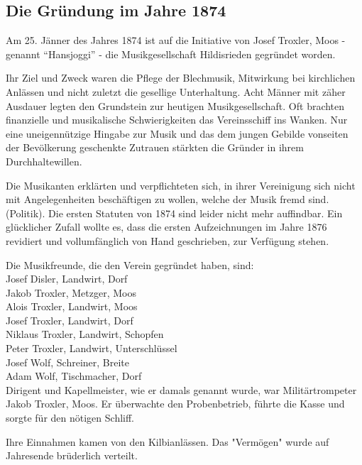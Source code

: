 \begin{history}

    \subsection*{Die Gründung im Jahre 1874}

    Am 25. Jänner des Jahres 1874 ist auf die Initiative von Josef Troxler, Moos
    - genannt \enquote{Hansjoggi} - die Musikgesellschaft Hildisrieden gegründet
    worden.

    Ihr Ziel und Zweck waren die Pflege der Blechmusik, Mitwirkung bei
    kirchlichen Anlässen und nicht zuletzt die gesellige Unterhaltung. Acht
    Männer mit zäher Ausdauer legten den Grundstein zur heutigen
    Musikgesellschaft. Oft brachten finanzielle und musikalische Schwierigkeiten
    das Vereinsschiff ins Wanken. Nur eine uneigennützige Hingabe zur Musik und
    das dem jungen Gebilde vonseiten der Bevölkerung geschenkte Zutrauen
    stärkten die Gründer in ihrem Durchhaltewillen.

    Die Musikanten erklärten und verpflichteten sich, in ihrer Vereinigung sich
    nicht mit Angelegenheiten beschäftigen zu wollen, welche der Musik fremd
    sind. (Politik). Die ersten Statuten von 1874 sind leider nicht mehr
    auffindbar. Ein glücklicher Zufall wollte es, dass die ersten Aufzeichnungen
    im Jahre 1876 revidiert und vollumfänglich von Hand geschrieben, zur
    Verfügung stehen.

    Die Musikfreunde, die den Verein gegründet haben, sind:\\

    \noindent
    Josef Disler, Landwirt, Dorf\\
    Jakob Troxler, Metzger, Moos\\
    Alois Troxler, Landwirt, Moos\\
    Josef Troxler, Landwirt, Dorf\\
    Niklaus Troxler, Landwirt, Schopfen\\
    Peter Troxler, Landwirt, Unterschlüssel\\
    Josef Wolf, Schreiner, Breite\\
    Adam Wolf, Tischmacher, Dorf\\


    Dirigent und Kapellmeister, wie er damals genannt wurde, war
    Militärtrompeter Jakob Troxler, Moos. Er überwachte den Probenbetrieb,
    führte die Kasse und sorgte für den nötigen Schliff.

    Ihre Einnahmen kamen von den Kilbianlässen. Das "Vermögen" wurde auf
    Jahresende brüderlich verteilt.

\end{history}
